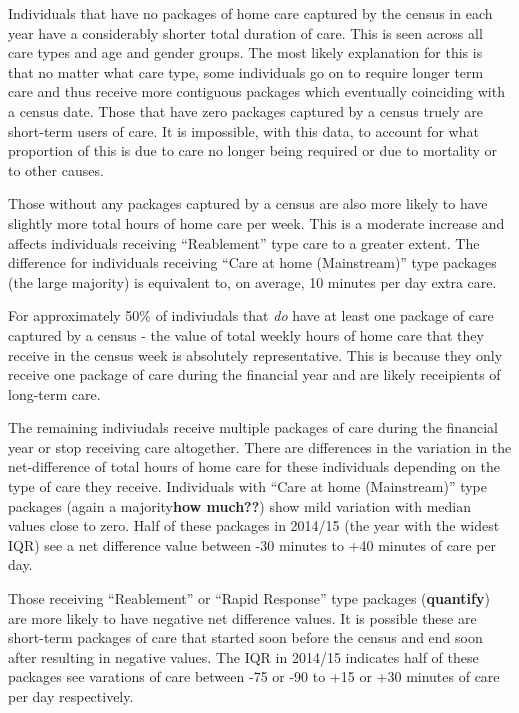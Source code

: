 \documentclass[]{article}
\begin{document}
Individuals that have no packages of home care captured by the census in
each year have a considerably shorter total duration of care. This is
seen across all care types and age and gender groups. The most likely
explanation for this is that no matter what care type, some individuals
go on to require longer term care and thus receive more contiguous
packages which eventually coinciding with a census date. Those that have
zero packages captured by a census truely are short-term users of care.
It is impossible, with this data, to account for what proportion of this
is due to care no longer being required or due to mortality or to other
causes.

Those without any packages captured by a census are also more likely to
have slightly more total hours of home care per week. This is a moderate
increase and affects individuals receiving ``Reablement'' type care to a
greater extent. The difference for individuals receiving ``Care at home
(Mainstream)'' type packages (the large majority) is equivalent to, on
average, 10 minutes per day extra care.

For approximately 50\% of indiviudals that \emph{do} have at least one
package of care captured by a census - the value of total weekly hours
of home care that they receive in the census week is absolutely
representative. This is because they only receive one package of care
during the financial year and are likely receipients of long-term care.

The remaining indiviudals receive multiple packages of care during the
financial year or stop receiving care altogether. There are differences
in the variation in the net-difference of total hours of home care for
these individuals depending on the type of care they receive.
Individuals with ``Care at home (Mainstream)'' type packages (again a
majority\textbf{how much??}) show mild variation with median values
close to zero. Half of these packages in 2014/15 (the year with the
widest IQR) see a net difference value between -30 minutes to +40
minutes of care per day.

Those receiving ``Reablement'' or ``Rapid Response'' type packages
(\textbf{quantify}) are more likely to have negative net difference
values. It is possible these are short-term packages of care that
started soon before the census and end soon after resulting in negative
values. The IQR in 2014/15 indicates half of these packages see
varations of care between -75 or -90 to +15 or +30 minutes of care per
day respectively.
\end{document}
